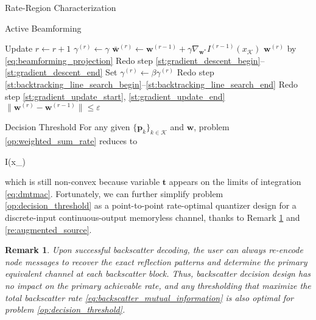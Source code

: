 \documentclass[journal]{IEEEtran}
\newtheorem{remark}{Remark}
\begin{document}
\begin{section}{Rate-Region Characterization}
\begin{subsection}{Active Beamforming}
\begin{algorithm}[!t]
\begin{algorithmic}[1]
				\Repeat
					\State Update $r \gets r+1$
					\State \phantom{Update} $\gamma^{(r)}\gets\gamma$
					\State \phantom{Update} $\bar{\boldsymbol{w}}^{(r)} \gets \boldsymbol{w}^{(r-1)}+\gamma\nabla_{\boldsymbol{w}^*} I^{(r-1)}(x_{\mathcal{K}})$ \label{st:backtracking_line_search_begin}
					\State \phantom{Update} $\boldsymbol{w}^{(r)}$ by \eqref{eq:beamforming_projection}
					\State Redo step \ref{st:gradient_descent_begin}--\ref{st:gradient_descent_end} \label{st:backtracking_line_search_end}
						\State Set $\gamma^{(r)}\gets\beta\gamma^{(r)}$
						\State Redo step \ref{st:backtracking_line_search_begin}--\ref{st:backtracking_line_search_end}
					\EndWhile
					\State Redo step \ref{st:gradient_update_start}, \ref{st:gradient_update_end}
				\Until $\lVert\boldsymbol{w}^{(r)}-\boldsymbol{w}^{(r-1)}\rVert \le \varepsilon$
			\end{algorithmic}
		\end{algorithm}
	\end{subsection}

	\begin{subsection}{Decision Threshold}
		For any given $\{\boldsymbol{p}_k\}_{k \in \mathcal{K}}$ and $\boldsymbol{w}$, problem \eqref{op:weighted_sum_rate} reduces to
		\begin{maxi!}
			{}{I(x_{})}{\label{op:decision_threshold}}{\label{ob:decision_threshold}}
			\addConstraint{\eqref{co:sequential_threshold},\eqref{co:nonnegative_threshold},}
		\end{maxi!}
		which is still non-convex because variable $\boldsymbol{t}$ appears on the limits of integration \eqref{eq:dmtmac}.
		Fortunately, we can further simplify problem \eqref{op:decision_threshold} as a point-to-point rate-optimal quantizer design for a discrete-input continuous-output memoryless channel, thanks to Remark \ref{re:backscatter_decision} and \ref{re:augmented_source}.

		\begin{remark}
			Upon successful backscatter decoding, the user can always re-encode node messages to recover the exact reflection patterns and determine the primary equivalent channel at each backscatter block.
			Thus, backscatter decision design has no impact on the primary achievable rate, and any thresholding that maximize the total backscatter rate \eqref{eq:backscatter_mutual_information} is also optimal for problem \eqref{op:decision_threshold}.
			\label{re:backscatter_decision}
		\end{remark}


\end{subsection}
\end{section}
\end{document}
